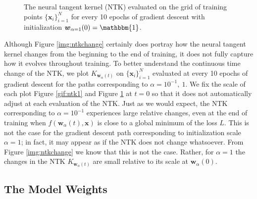 \documentclass{article}
\begin{document}
\begin{figure}
\caption{The neural tangent kernel (NTK) evaluated on the grid of training points $\{ \boldsymbol{x}_i \}_{i=1}^N$ for every 10 epochs of gradient descent with initialization $\boldsymbol{w}_{\alpha = 1}(0) = \mathbbm{1}$.}\label{gif:ntk2}
\end{figure}

Although Figure \ref{img:ntkchange} certainly does portray how the neural tangent kernel changes from the beginning to the end of training, it does not fully capture how it evolves throughout training. To better understand the continuous time change of the NTK, we plot $K_{\boldsymbol{w}_{\alpha}(t)}$ on $\{ \boldsymbol{x}_i \}_{i=1}^N$ evaluated at every 10 epochs of gradient descent for the paths corresponding to $\alpha = 10^{-1}, \ 1$. We fix the scale of each plot Figure \ref{gif:ntk1} and Figure \ref{gif:ntk2} at $t = 0$ so that it does not automatically adjust at each evaluation of the NTK. Just as we would expect, the NTK corresponding to $\alpha = 10^{-1}$ experiences large relative changes, even at the end of training when $f(\boldsymbol{w}_{\alpha}(t), \boldsymbol{x})$ is close to a global minimum of the loss $L$. This is not the case for the gradient descent path corresponding to initialization scale $\alpha = 1$; in fact, it may appear as if the NTK does not change whatsoever. From Figure \ref{img:ntkchange} we know that this is not the case. Rather, for $\alpha = 1$ the changes in the NTK $K_{\boldsymbol{w}_{\alpha}(t)}$ are small relative to its scale at $\boldsymbol{w}_{\alpha}(0)$.

\subsection{The Model Weights}
\end{document}
